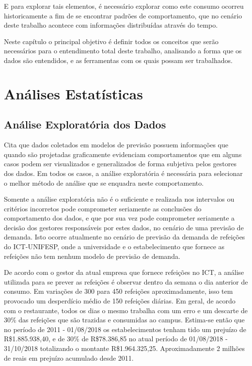 \documentclass[	12pt, Times, openright, twoside, a4paper, english, brazil]{abntex2}
\begin{document}
        E para explorar tais elementos, é necessário explorar como este consumo ocorreu historicamente a fim de se encontrar padrões de comportamento, que no cenário deste trabalho acontece com informações distribuídas através do tempo. 

        Neste capítulo o principal objetivo é definir todos os conceitos que serão necessários para o entendimento total deste trabalho, analisando a forma que os dados são entendidos, e as ferramentas com os quais possam ser trabalhados.

      \section{Análises Estatísticas}
        \subsection{Análise Exploratória dos Dados}
          \cite{Junior2007} Cita que dados coletados em modelos de previsão possuem informações que quando são projetadas graficamente evidenciam comportamentos que em alguns casos podem ser visualizados e generalizados de forma subjetiva pelos gestores dos dados.  
          Em todos os casos, a análise exploratória é necessária para selecionar o melhor método de análise que se enquadra neste comportamento.

          Somente a análise exploratória não é o suficiente e realizada nos intervalos ou critérios incorretos pode comprometer seriamente as conclusões do comportamento dos dados, e que por sua vez pode comprometer seriamente a decisão dos gestores responsáveis por estes dados, no cenário de uma previsão de demanda. 
          Isto ocorre atualmente no cenário de previsão da demanda de refeições do ICT-UNIFESP, onde a universidade e o estabelecimento que fornece as refeições não tem nenhum modelo de previsão de demanda. 

          De acordo com o gestor da atual empresa que fornece refeições no ICT, a análise utilizada para se prever as refeições é observar dentro da semana o dia anterior de consumo. Em variações de 300 para 450 refeições aproximadamente, isso tem provocado um desperdício médio de 150 refeições diárias. Em geral, de acordo com o restaurante, todos os dias o mesmo trabalha com um erro e um descarte de 30\% das refeições que são trazidas e consumidas ao campus. Estima-se então que no período de 2011 - 01/08/2018 os estabelecimentos tenham tido um prejuízo de R\$1.885.938,40, e de 30\% de R\$78.386,85 no atual período de 01/08/2018 - 31/10/2018 totalizando o montante  R\$1.964.325,25. Aproximadamente 2 milhões de reais em prejuízo acumulado desde 2011.
\end{document}
